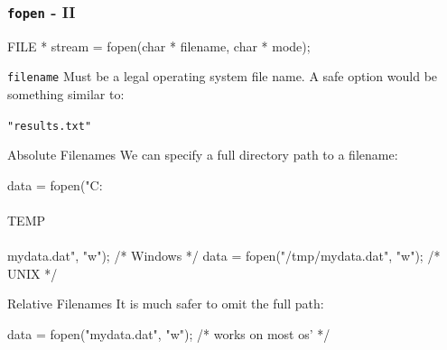 \documentclass[table]{beamer}
\newif\ifschigh\schighfalse
\newcommand{\kw}[1]{\ifschigh\textcolor{red}{#1}\else\textcolor{keyword}{#1}\fi}
\newcommand{\kt}[1]{\ifschigh\textcolor{red}{#1}\else\textcolor{ctext}{#1}\fi}
\newcommand{\kc}[1]{\ifschigh\textcolor{red}{#1}\else\textcolor{comment}{#1}\fi}
\begin{document}
\begin{frame}[fragile]
\frametitle{{\tt fopen} - II}
\begin{semiverbatim}
\small
FILE * stream = fopen(\kw{char} * filename, \kw{char} * mode);
\end{semiverbatim}
\begin{block}{\tt filename}
Must be a legal operating system file name. A safe option would be something similar to:
\vspace{-0.1in}
\begin{center}
\tt \kt{"results.txt"}
\end{center}
\end{block}

\begin{alertblock}{Absolute Filenames}
We can specify a full directory path to a filename:
\vspace{-0.2in}
\begin{semiverbatim}
\footnotesize
data = fopen(\kt{"C:\\\\TEMP\\\\mydata.dat"}, \kt{"w"}); \kc{/* Windows */}
data = fopen(\kt{"/tmp/mydata.dat"}, \kt{"w"});      \kc{/* UNIX */}
\end{semiverbatim}
\end{alertblock}

\begin{exampleblock}{Relative Filenames}
It is much safer to omit the full path:
\vspace{-0.2in}
\begin{semiverbatim}
\footnotesize
data = fopen(\kt{"mydata.dat"}, \kt{"w"}); \kc{/* works on most os' */}
\end{semiverbatim}
\end{exampleblock}
\end{frame}
\end{document}
